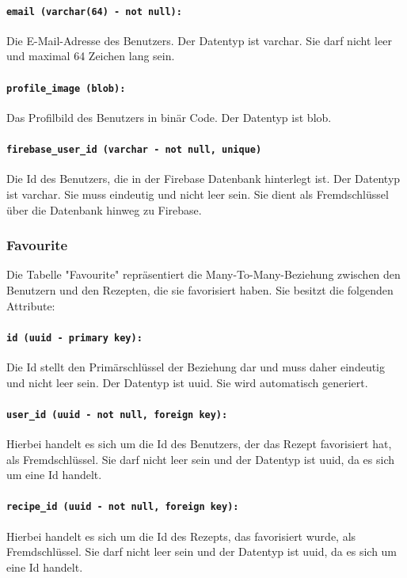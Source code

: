 \documentclass{entwurfsheft}
\begin{document}
\paragraph{\texttt{email (varchar(64) - not null):}} Die E-Mail-Adresse des Benutzers. Der Datentyp ist \Gls{varchar}. Sie darf nicht leer und maximal 64 Zeichen lang sein.
\paragraph{\texttt{profile\_image (blob):}} Das Profilbild des Benutzers in binär Code. Der Datentyp ist \Gls{blob}.
\paragraph{\texttt{firebase\_user\_id (varchar - not null, unique)}} Die Id des Benutzers, die in der Firebase Datenbank hinterlegt ist. Der Datentyp ist \Gls{varchar}. Sie muss eindeutig und nicht leer sein. Sie dient als Fremdschlüssel über die Datenbank hinweg zu Firebase.
\newpage
\subsubsection{Favourite}
Die Tabelle "Favourite" repräsentiert die Many-To-Many-Beziehung zwischen den Benutzern und den Rezepten, die sie favorisiert haben. Sie besitzt die folgenden Attribute:
\paragraph{\texttt{id (uuid - primary key):}} Die Id stellt den Primärschlüssel der Beziehung dar und muss daher eindeutig und nicht leer sein. Der Datentyp ist \Gls{uuid}. Sie wird automatisch generiert.
\paragraph{\texttt{user\_id (uuid - not null, foreign key):}} Hierbei handelt es sich um die Id des Benutzers, der das Rezept favorisiert hat, als Fremdschlüssel. Sie darf nicht leer sein und der Datentyp ist \Gls{uuid}, da es sich um eine Id handelt.
\paragraph{\texttt{recipe\_id (uuid - not null, foreign key):}} Hierbei handelt es sich um die Id des Rezepts, das favorisiert wurde, als Fremdschlüssel. Sie darf nicht leer sein und der Datentyp ist \Gls{uuid}, da es sich um eine Id handelt.
\newpage
\end{document}
